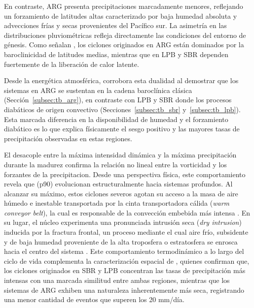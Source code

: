 En contraste, ARG presenta precipitaciones marcadamente menores, reflejando un forzamiento de latitudes altas caracterizado por baja humedad absoluta y advecciones frías y secas provenientes del Pacífico sur.
La asimetría en las distribuciones pluviométricas refleja directamente las condiciones del entorno de génesis. 
Como señalan \citet{gramcianinov2019properties}, los ciclones originados en ARG están dominados por la baroclinicidad de latitudes medias, mientras que en LPB y SBR dependen fuertemente de la liberación de calor latente. 

Desde la energética atmosférica, \citet{coutodesouza2024thesis} corrobora esta dualidad al demostrar que los sistemas en ARG se sustentan en la cadena baroclínica clásica (Sección~\ref{subsec:tb_arg}), en contraste con LPB y SBR donde los procesos diabáticos 
de origen convectivo (Secciones~\ref{subsec:tb_sbr} y~\ref{subsec:tb_lpb}).
Esta marcada diferencia en la disponibilidad de humedad y el forzamiento diabático es lo que explica físicamente el sesgo positivo y las mayores tasas de precipitación observadas en estas regiones.

El desacople entre la máxima intensidad dinámica y la máxima precipitación durante la madurez confirma la relación no lineal entre la vorticidad y los forzantes de la precipitacion.
Desde una perspectiva física, este comportamiento revela que  (p90) evolucionan estructuralmente hacia sistemas profundos. 
Al alcanzar su máximo, estos ciclones severos agotan su acceso a la masa de aire húmedo e inestable transportada por la cinta transportadora cálida (\textit{warm conveyor belt}), la cual es responsable de la convección embebida más intensa \citep{oertel2021warm, blanchard2021warm}. 
En su lugar, el núcleo experimenta una pronunciada intrusión seca (\textit{dry intrusion}) inducida por la fractura frontal, un proceso mediante el cual aire frío, subsidente y de baja humedad proveniente de la alta troposfera o estratosfera se enrosca hacia el centro del sistema \citep{shapiro1999bridge}. 
Este comportamiento termodinámico a lo largo del ciclo de vida complementa la caracterización espacial de \citet{gramcianinov2019properties}, quienes confirman que, los ciclones originados en SBR y LPB concentran las tasas de precipitación más intensas con una marcada similitud entre ambas regiones, mientras que los sistemas de ARG exhiben una naturaleza inherentemente más seca, registrando una menor cantidad de eventos que superen los 20 mm/día.

